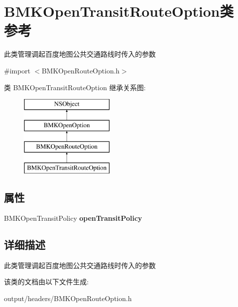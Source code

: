 \hypertarget{interface_b_m_k_open_transit_route_option}{}\section{B\+M\+K\+Open\+Transit\+Route\+Option类 参考}
\label{interface_b_m_k_open_transit_route_option}


此类管理调起百度地图公共交通路线时传入的参数  




{\ttfamily \#import $<$B\+M\+K\+Open\+Route\+Option.\+h$>$}

类 B\+M\+K\+Open\+Transit\+Route\+Option 继承关系图\+:\begin{figure}[H]
\begin{center}
\leavevmode
\includegraphics[height=4.000000cm]{interface_b_m_k_open_transit_route_option}
\end{center}
\end{figure}
\subsection*{属性}
\begin{DoxyCompactItemize}
\item 
\hypertarget{interface_b_m_k_open_transit_route_option_aa428af41f96d0233345de96ae4e8cc8d}{}B\+M\+K\+Open\+Transit\+Policy {\bfseries open\+Transit\+Policy}\label{interface_b_m_k_open_transit_route_option_aa428af41f96d0233345de96ae4e8cc8d}

\end{DoxyCompactItemize}


\subsection{详细描述}
此类管理调起百度地图公共交通路线时传入的参数 

该类的文档由以下文件生成\+:\begin{DoxyCompactItemize}
\item 
output/headers/B\+M\+K\+Open\+Route\+Option.\+h\end{DoxyCompactItemize}
